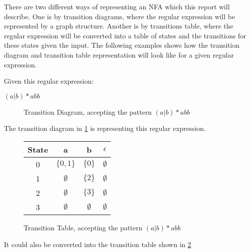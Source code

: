 There are two different ways of representing an NFA which this report will
describe. One is by transition diagrams, where the regular expression will be
represented by a graph structure. Another is by transitions table, where the 
regular expression will be converted into a table of states and the 
transitions for these states given the input. The following examples shows how 
the transition diagram and transition table representation will look like for a 
given regular expression.

\begin{example} \label{regexp2td}
Given this regular expression:
\begin{center}
    $(a | b)* abb$ 
\end{center}

\begin{figure}[h!]
  \centering
  \caption{Transition Diagram, accepting the pattern $(a | b)* abb$
  \label{fig:td}}
\end{figure}

The transition diagram in \cref{fig:td} is representing this regular expression.

\begin{figure}[h!]
  \centering
  \begin{tabular}{| c | c c c |}
    \hline
    \hline
    State & a & b & $\epsilon$\\
    \hline
    0 & $\{0, 1\}$ & $\{0\}$ & $\emptyset$ \\
    1 & $\emptyset$ & $\{2\}$ & $\emptyset$ \\
    2 & $\emptyset$ & $\{3\}$ & $\emptyset$ \\
    3 & $\emptyset$ & $\emptyset$ & $\emptyset$ \\
    \hline
  \end{tabular}
  \caption{Transition Table, accepting the pattern $(a | b)* abb$
  \label{fig:tt}}
\end{figure}

It could also be converted into the transition table shown in \cref{fig:tt}
\end{example}

